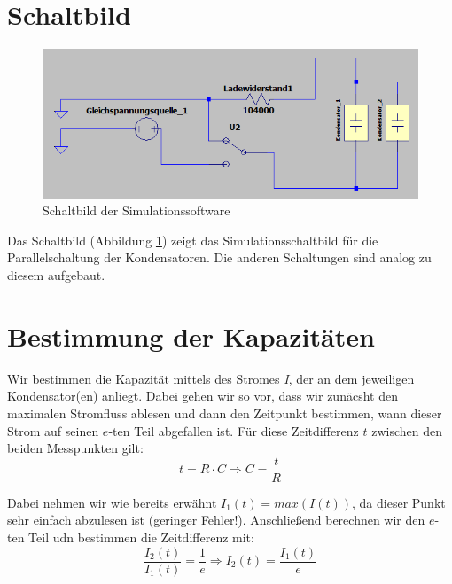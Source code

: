 \documentclass[10pt,a4paper]{article}
\begin{document}
\newpage

\tableofcontents

\vspace{10pt}

\section{Schaltbild}
\begin{flushleft}
\begin{figure}[h]
\centering
\includegraphics[scale=0.5]{Schaltbild_prallel}
\caption{Schaltbild der Simulationssoftware}
\label{fig:Schaltbild}
\end{figure}
Das Schaltbild (Abbildung \ref{fig:Schaltbild}) zeigt das Simulationsschaltbild für die Parallelschaltung der Kondensatoren. Die anderen Schaltungen sind analog zu diesem aufgebaut.
\end{flushleft}

\section{Bestimmung der Kapazitäten}
\begin{flushleft}
Wir bestimmen die Kapazität mittels des Stromes \textit{I}, der an dem jeweiligen Kondensator(en) anliegt. Dabei gehen wir so vor, dass wir zunäcsht den maximalen Stromfluss ablesen und dann den Zeitpunkt bestimmen, wann dieser Strom auf seinen $e$-ten Teil abgefallen ist. Für diese Zeitdifferenz $t$ zwischen den beiden Messpunkten gilt:
\begin{equation}\label{eq:capa}
t = R \cdot C \Rightarrow C = \frac{t}{R}
\end{equation}

Dabei nehmen wir wie bereits erwähnt $I_1(t) = max(I(t))$, da dieser Punkt sehr einfach abzulesen ist (geringer Fehler!). Anschließend berechnen wir den $e$-ten Teil udn bestimmen die Zeitdifferenz mit:
\begin{equation}\label{eq:epart}
\frac{I_2(t)}{I_1(t)} = \frac{1}{e} \Rightarrow I_2(t) = \frac{I_1(t)}{e}
\end{equation}
\end{flushleft}
\end{document}
